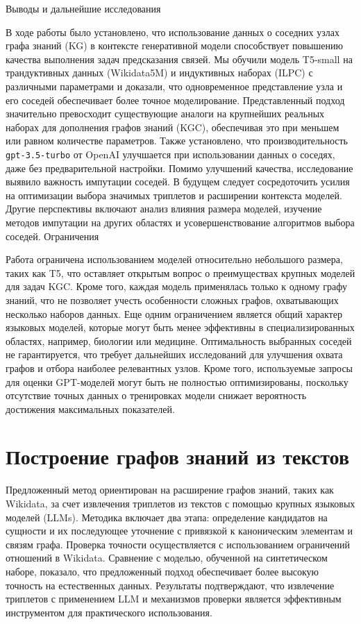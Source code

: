 Выводы и дальнейшие исследования

В ходе работы было установлено, что использование данных о соседних узлах графа знаний (KG) в контексте генеративной модели способствует повышению качества выполнения задач предсказания связей. Мы обучили модель T5-small на трандуктивных данных (Wikidata5M) и индуктивных наборах (ILPC) с различными параметрами и доказали, что одновременное представление узла и его соседей обеспечивает более точное моделирование. Представленный подход значительно превосходит существующие аналоги на крупнейших реальных наборах для дополнения графов знаний (KGC), обеспечивая это при меньшем или равном количестве параметров. Также установлено, что производительность \texttt{gpt-3.5-turbo} от OpenAI улучшается при использовании данных о соседях, даже без предварительной настройки. Помимо улучшений качества, исследование выявило важность импутации соседей. В будущем следует сосредоточить усилия на оптимизации выбора значимых триплетов и расширении контекста моделей. Другие перспективы включают анализ влияния размера моделей, изучение методов импутации на других областях и усовершенствование алгоритмов выбора соседей.
Ограничения

Работа ограничена использованием моделей относительно небольшого размера, таких как T5, что оставляет открытым вопрос о преимуществах крупных моделей для задач KGC. Кроме того, каждая модель применялась только к одному графу знаний, что не позволяет учесть особенности сложных графов, охватывающих несколько наборов данных. Еще одним ограничением является общий характер языковых моделей, которые могут быть менее эффективны в специализированных областях, например, биологии или медицине. Оптимальность выбранных соседей не гарантируется, что требует дальнейших исследований для улучшения охвата графов и отбора наиболее релевантных узлов. Кроме того, используемые запросы для оценки GPT-моделей могут быть не полностью оптимизированы, поскольку отсутствие точных данных о тренировках модели снижает вероятность достижения максимальных показателей.

\section{Построение графов знаний из текстов}

Предложенный метод ориентирован на расширение графов знаний, таких как Wikidata, за счет извлечения триплетов из текстов с помощью крупных языковых моделей (LLMs). Методика включает два этапа: определение кандидатов на сущности и их последующее уточнение с привязкой к каноническим элементам и связям графа. Проверка точности осуществляется с использованием ограничений отношений в Wikidata. Сравнение с моделью, обученной на синтетическом наборе, показало, что предложенный подход обеспечивает более высокую точность на естественных данных. Результаты подтверждают, что извлечение триплетов с применением LLM и механизмов проверки является эффективным инструментом для практического использования.

